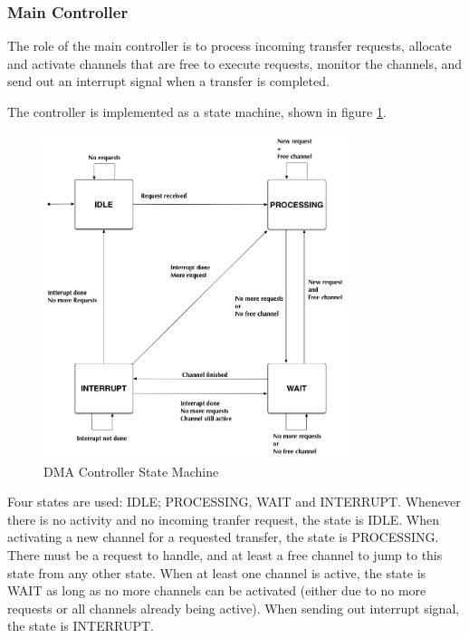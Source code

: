 \subsubsection{Main Controller}
The role of the main controller is to process incoming transfer requests, allocate and activate
channels that are free to execute requests, monitor the channels, and send out an interrupt signal
when a transfer is completed.

The controller is implemented as a state machine, shown in figure \ref{fig:DMAControllerStateMachineSimple}.

\begin{figure}[htb]
    \centering
    \includegraphics[width=0.8\textwidth]{Figures/DMA/StateMachineFinalSimple}
    \caption{DMA Controller State Machine}
    \label{fig:DMAControllerStateMachineSimple}
\end{figure}

Four states are used: IDLE; PROCESSING, WAIT and INTERRUPT.
Whenever there is no activity and no incoming tranfer request, the state is IDLE.
When activating a new channel for a requested transfer, the state is PROCESSING. There must be a request to handle, and at least a free channel to jump to this state from any other state.
When at least one channel is active, the state is WAIT as long as no more channels can be activated (either due to no more requests or all channels already being active).
When sending out interrupt signal, the state is INTERRUPT.

